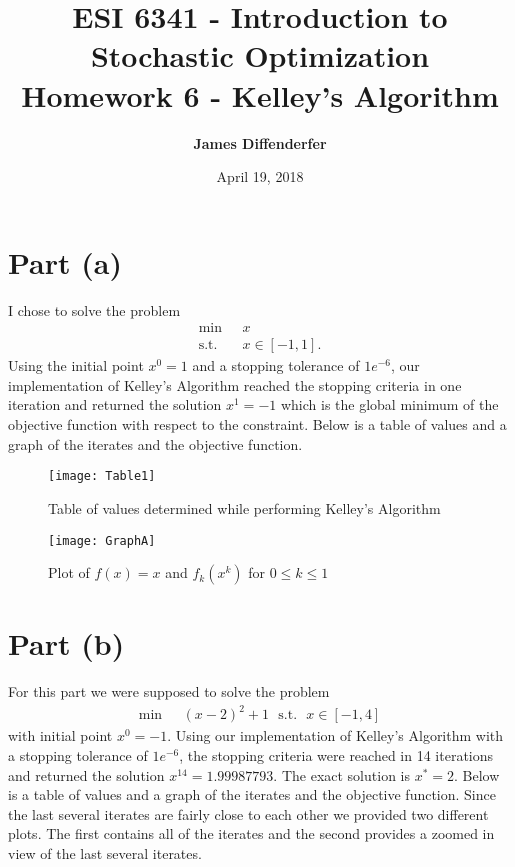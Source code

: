 \documentclass[11pt]{article}
\title{\bfseries ESI 6341 - Introduction to Stochastic Optimization \\ Homework 6 - Kelley's Algorithm}
\author{\bfseries James Diffenderfer}
\date{April 19, 2018}
\theoremstyle{definition}
\begin{document}
\maketitle
\tableofcontents


\newpage
\section*{Part (a)}
I chose to solve the problem
\begin{align*}
\min \ \ \ &x \\
\text{s.t.} \ \ \ &x \in [-1, 1].
\end{align*}
Using the initial point $x^0 = 1$ and a stopping tolerance of $1e^{-6}$, our implementation of Kelley's Algorithm reached the stopping criteria in one iteration and returned the solution $x^1 = -1$ which is the global minimum of the objective function with respect to the constraint. Below is a table of values and a graph of the iterates and the objective function. \\

\begin{figure}[h!]
\texttt{[image: Table1]}
\centering
\caption{Table of values determined while performing Kelley's Algorithm}
\end{figure}
\quad

\begin{figure}[h!]
\texttt{[image: GraphA]}
\centering
\caption{Plot of $f(x) = x$ and $f_k(x^k)$ for $0 \leq k \leq 1$}
\end{figure}


\newpage
\section*{Part (b)}
For this part we were supposed to solve the problem
\begin{align*}
\min \ \ \ &(x - 2)^2 + 1 \ \ \ \text{s.t.} \ \ \ x \in [-1, 4]
\end{align*}
with initial point $x^0 = -1$. Using our implementation of Kelley's Algorithm with a stopping tolerance of $1e^{-6}$, the stopping criteria were reached in 14 iterations and returned the solution $x^{14} = 1.99987793$. The exact solution is $x^* = 2$. Below is a table of values and a graph of the iterates and the objective function. Since the last several iterates are fairly close to each other we provided two different plots. The first contains all of the iterates and the second provides a zoomed in view of the last several iterates.
\end{document}
